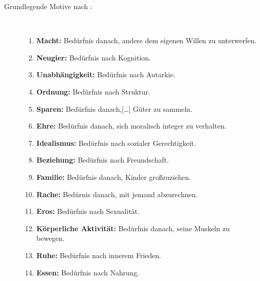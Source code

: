 \documentclass[a4paper,12pt]{scrartcl}
\begin{document}
\begin{description}
   \item[Grundlegende Motive nach \cite{Reiss2009}:]~\par
   \begin{enumerate}
      \item \textbf{Macht:} Bedürfnis danach, andere dem eigenen Willen zu unterwerfen.
      \item \textbf{Neugier:} Bedürfnis nach Kognition.
      \item \textbf{Unabhängigkeit:} Bedürfnis nach Autarkie.
      \item \textbf{Ordnung:} Bedürfnis nach Struktur.
      \item \textbf{Sparen:} Bedürfnis danach,[…] Güter zu sammeln.
      \item \textbf{Ehre:} Bedürfnis danach, sich moralisch integer zu verhalten.
      \item \textbf{Idealismus:} Bedürfnis nach sozialer Gerechtigkeit.
      \item \textbf{Beziehung:} Bedürfnis nach Freundschaft.
      \item \textbf{Familie:} Bedürfnis danach, Kinder großzuziehen.
      \item \textbf{Rache:} Bedürnis danach, mit jemand abzurechnen.
      \item \textbf{Eros:} Bedürfnis nach Sexualität.
      \item \textbf{Körperliche Aktivität:} Bedürfnis danach, seine Muskeln zu bewegen.
      \item \textbf{Ruhe:} Bedürfnis nach innerem Frieden.
      \item \textbf{Essen:} Bedürfnis nach Nahrung.
   \end{enumerate}
\end{description}
\end{document}
